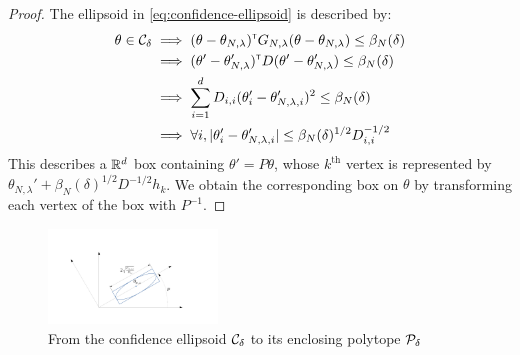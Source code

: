\documentclass{article}
\begin{document}
\begin{proof}
The ellipsoid in \eqref{eq:confidence-ellipsoid} is described by:
\begin{align*}
    \theta\in\mathcal{C}_\delta &\implies
    (\theta-\theta_{N,\lambda})^{\mathsf{\scriptscriptstyle T}} G_{N,\lambda}(\theta-\theta_{N,\lambda}) \leq \beta_{N}(\delta)\\
    &\implies (\theta'-\theta'_{N,\lambda})^{\mathsf{\scriptscriptstyle T}} D (\theta'-\theta'_{N,\lambda}) \leq \beta_{N}(\delta)\\
    &\implies \sum_{i=1}^d D_{i,i}(\theta'_i-\theta'_{N,\lambda,i})^2\leq \beta_{N}(\delta)\\
    &\implies\forall i, |\theta'_i-\theta'_{N,\lambda,i}|\leq \beta_{N}(\delta)^{1/2}D_{i,i}^{-1/2}
\end{align*}
This describes a $\mathbb{R}^d$ box containing $\theta' = P\theta$, whose $k^\text{th}$ vertex is represented by $\theta_{N,\lambda}' + \beta_{N}(\delta)^{1/2}D^{-1/2} h_k$. We obtain the corresponding box on $\theta$ by transforming each vertex of the box with $P^{-1}$.
\end{proof}

\begin{figure}
    \centering
    \includegraphics[trim={3.8cm, 2cm, 5cm, 3.8cm}, clip, width=0.4\textwidth]{img/ellipsoid_to_polytope}
    \caption{From the confidence ellipsoid $\mathcal{C}_\delta$ to its enclosing polytope $\mathcal{P}_\delta$}
    \label{fig:ellipsoid_to_polytope}
\end{figure}
\end{document}
